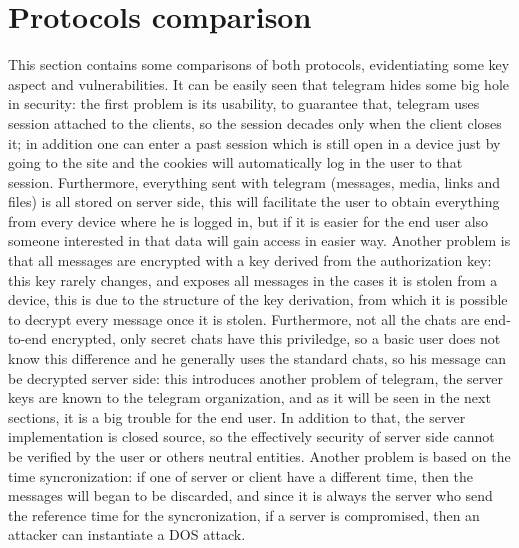 \documentclass{article}
\begin{document}

\section{Protocols comparison}

This section contains some comparisons of both protocols, evidentiating some key aspect and vulnerabilities. \newline
It can be easily seen that telegram hides some big hole in security: the first problem is its usability, to guarantee that, telegram uses session attached to the clients, so the session decades only when the client closes it; in addition one can enter a past session which is still open in a device just by going to the site and the cookies will automatically log in the user to that session. Furthermore, everything sent with telegram (messages, media, links and files) is all stored on server side, this will facilitate the user to obtain everything from every device where he is logged in, but if it is easier for the end user also someone interested in that data will gain access in easier way. Another problem is that all messages are encrypted with a key derived from the authorization key: this key rarely changes, and exposes all messages in the cases it is stolen from a device, this is due to the structure of the key derivation, from which it is possible to decrypt every message once it is stolen.\newline
Furthermore, not all the chats are end-to-end encrypted, only secret chats have this priviledge, so a basic user does not know this difference and he generally uses the standard chats, so his message can be decrypted server side: this introduces another problem of telegram, the server keys are known to the telegram organization, and as it will be seen in the next sections, it is a big trouble for the end user. In addition to that, the server implementation is closed source, so the effectively security of server side cannot be verified by the user or others neutral entities.\newline
Another problem is based on the time syncronization: if one of server or client have a different time, then the messages will began to be discarded, and since it is always the server who send the reference time for the syncronization, if a server is compromised, then an attacker can instantiate a DOS attack.\newline
\end{document}
